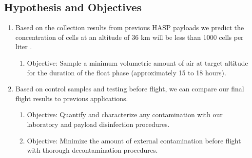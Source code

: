 \subsection{Hypothesis and Objectives}
\label{subsec:Hypothesis and Objectives}
\begin{enumerate}
\item Based on the collection results from previous HASP payloads we predict the concentration of cells at an altitude of 36 km will be less than 1000 cells per liter \citep{LSU}.
	\begin{enumerate}
	\item Objective: Sample a minimum volumetric amount of air at target altitude for the duration of the float phase (approximately 15 to 18 hours).
	\end{enumerate}
\item Based on control samples and testing before flight, we can compare our final flight results to previous applications.
	\begin{enumerate}
	\item Objective: Quantify and characterize any contamination with our laboratory and payload disinfection procedures.
	\item Objective: Minimize the amount of external contamination before flight with thorough decontamination procedures.
	\end{enumerate}

\end{enumerate}
